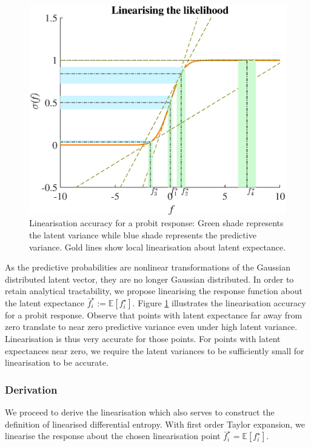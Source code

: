 \documentclass{article}
\begin{document}
		\begin{figure}[!htbp]
			\centering
				\includegraphics[width = \linewidth]{Figures/linearisation.eps}
			\caption{Linearisation accuracy for a probit response: Green shade represents the latent variance while blue shade represents the predictive variance. Gold lines show local linearisation about latent expectance.}
			\label{Figure:Linearisation}
		\end{figure}
			
		As the predictive probabilities are nonlinear transformations of the Gaussian distributed latent vector, they are no longer Gaussian distributed. In order to retain analytical tractability, we propose linearising the response function about the latent expectance $\bar{f}^{\star}_{i} := \mathbb{E}[f^{\star}_{i}]$. Figure \ref{Figure:Linearisation} illustrates the linearisation accuracy for a probit response. Observe that points with latent expectance far away from zero translate to near zero predictive variance even under high latent variance. Linearisation is thus very accurate for those points. For points with latent expectances near zero, we require the latent variances to be sufficiently small for linearisation to be accurate.
		
		\subsubsection{Derivation}
		
			We proceed to derive the linearisation which also serves to construct the definition of linearised differential entropy. With first order Taylor expansion, we linearise the response about the chosen linearisation point $\bar{f}^{\star}_{i} = \mathbb{E}[f^{\star}_{i}]$.
			
\end{document}
